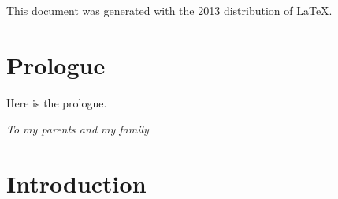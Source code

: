 \documentclass[12pt, letterpaper, twoside]{article}
\begin{document}
\pagestyle{fancy}
\renewcommand{\sectionmark}[1]{\markboth{}{\MakeUppercase{\emph{#1}}}}
\renewcommand{\subsectionmark}[1]{\markboth{\emph{#1}}{}}
\renewcommand{\headrulewidth}{0pt}
\fancyhead{}
\fancyfoot{}





\cleardoublepage

This document was generated with the 2013 distribution of \LaTeX. 


\cleardoublepage
\setcounter{page}{1}

\fancyfoot[LE,RO]{\thepage}

\vspace*{100pt}
\section*{Prologue}
\vspace{50pt}

Here is the prologue.


\cleardoublepage

\vspace*{100pt}
\tableofcontents


\cleardoublepage
\setcounter{page}{1}
\fancyfoot{}



\cleardoublepage
\vspace*{100pt}
\begin{center}
\emph{To my parents and my family}
\end{center}

\cleardoublepage

\renewcommand{\headrulewidth}{1pt}
\fancyfoot[LE,RO]{\thepage}
\fancyhead[LE]{\rightmark}
\fancyhead[RO]{\leftmark} 
 
\vspace*{100pt}
\section{Introduction}
\vspace{50pt}
\end{document}
